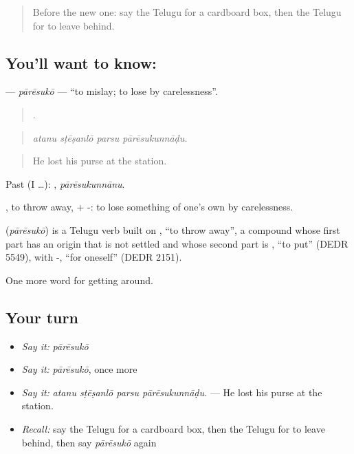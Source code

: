 \label{lesson:TE-C461-paresuko}



\begin{quote}
Before the new one: say the Telugu for a cardboard box, then the Telugu for to leave behind.
\end{quote}

\subsection*{You'll want to know: }
\textbf{} — \emph{pārēsukō} — \textquotedblleft{}to mislay; to lose by carelessness\textquotedblright{}.

\begin{quote}
   .
\end{quote}

\begin{quote}
\emph{atanu sṭēṣanlō parsu pārēsukunnāḍu.}
\end{quote}

\begin{quote}
He lost his purse at the station.
\end{quote}

Past (I …): , \emph{pārēsukunnānu}.

, to throw away, + -: to lose something of one's own by carelessness.

\begin{cousinweb}
\textbf{} (\emph{pārēsukō}) is a Telugu verb built on , \textquotedblleft{}to throw away\textquotedblright{}, a compound whose first part has an origin that is not settled and whose second part is , \textquotedblleft{}to put\textquotedblright{} (DEDR 5549), with -, \textquotedblleft{}for oneself\textquotedblright{} (DEDR 2151).
\end{cousinweb}

\begin{grammarlens}[title={What you've built}]
One more word for getting around.
\end{grammarlens}

\subsection*{Your turn}
\begin{itemize}
\raggedright
  \item \emph{Say it:} \emph{pārēsukō}
  \item \emph{Say it:} \emph{pārēsukō}, once more
  \item \emph{Say it:} \emph{atanu sṭēṣanlō parsu pārēsukunnāḍu.} — He lost his purse at the station.
  \item \emph{Recall:} say the Telugu for a cardboard box, then the Telugu for to leave behind, then say \emph{pārēsukō} again
\end{itemize}

